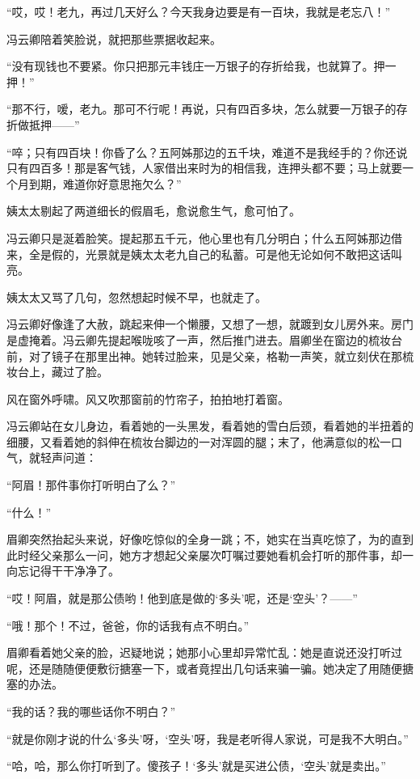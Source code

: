 \par “哎，哎！老九，再过几天好么？今天我身边要是有一百块，我就是老忘八！”
\par 冯云卿陪着笑脸说，就把那些票据收起来。
\par “没有现钱也不要紧。你只把那元丰钱庄一万银子的存折给我，也就算了。押一押！”
\par “那不行，嗳，老九。那可不行呢！再说，只有四百多块，怎么就要一万银子的存折做抵押——”
\par “啐；只有四百块！你昏了么？五阿姊那边的五千块，难道不是我经手的？你还说只有四百多！那是客气钱，人家借出来时为的相信我，连押头都不要；马上就要一个月到期，难道你好意思拖欠么？”
\par 姨太太剔起了两道细长的假眉毛，愈说愈生气，愈可怕了。
\par 冯云卿只是涎着脸笑。提起那五千元，他心里也有几分明白；什么五阿姊那边借来，全是假的，光景就是姨太太老九自己的私蓄。可是他无论如何不敢把这话叫亮。
\par 姨太太又骂了几句，忽然想起时候不早，也就走了。
\par 冯云卿好像逢了大赦，跳起来伸一个懒腰，又想了一想，就踱到女儿房外来。房门是虚掩着。冯云卿先提起喉咙咳了一声，然后推门进去。眉卿坐在窗边的梳妆台前，对了镜子在那里出神。她转过脸来，见是父亲，格勒一声笑，就立刻伏在那梳妆台上，藏过了脸。
\par 风在窗外呼啸。风又吹那窗前的竹帘子，拍拍地打着窗。
\par 冯云卿站在女儿身边，看着她的一头黑发，看着她的雪白后颈，看着她的半扭着的细腰，又看着她的斜伸在梳妆台脚边的一对浑圆的腿；末了，他满意似的松一口气，就轻声问道：
\par “阿眉！那件事你打听明白了么？”
\par “什么！”
\par 眉卿突然抬起头来说，好像吃惊似的全身一跳；不，她实在当真吃惊了，为的直到此时经父亲那么一问，她方才想起父亲屡次叮嘱过要她看机会打听的那件事，却一向忘记得干干净净了。
\par “哎！阿眉，就是那公债哟！他到底是做的‘多头’呢，还是‘空头’？——”
\par “哦！那个！不过，爸爸，你的话我有点不明白。”
\par 眉卿看着她父亲的脸，迟疑地说；她那小心里却异常忙乱：她是直说还没打听过呢，还是随随便便敷衍搪塞一下，或者竟捏出几句话来骗一骗。她决定了用随便搪塞的办法。
\par “我的话？我的哪些话你不明白？”
\par “就是你刚才说的什么‘多头’呀，‘空头’呀，我是老听得人家说，可是我不大明白。”
\par “哈，哈，那么你打听到了。傻孩子！‘多头’就是买进公债，‘空头’就是卖出。”
